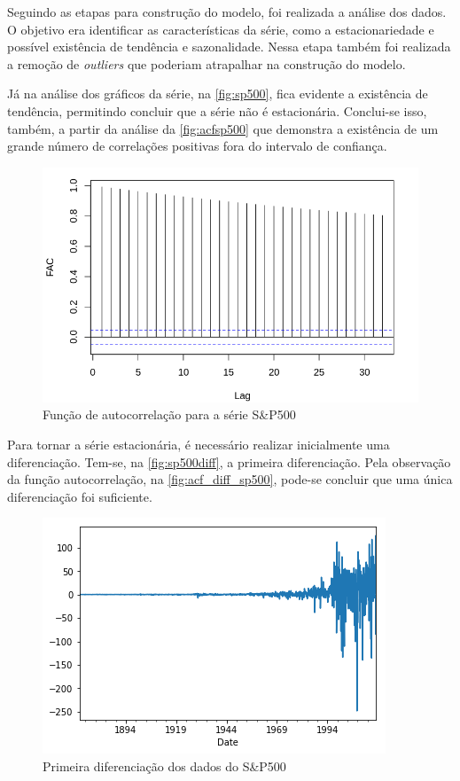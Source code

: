 \documentclass[
    12pt,
    oneside,
    a4paper,
    english,
    brazil
]{abntex2}
\begin{document}
Seguindo  as etapas  para construção  do modelo,  foi realizada  a análise  dos
dados.  O  objetivo  era  identificar  as  características  da  série,  como  a
estacionariedade e possível existência de  tendência e  sazonalidade. Nessa etapa também foi realizada a remoção  de \textit{outliers} que poderiam  atrapalhar na
construção do modelo.

Já na  análise dos gráficos da  série, na \autoref{fig:sp500}, fica  evidente a
existência de  tendência, permitindo concluir  que a série não  é estacionária.
Conclui-se  isso, também,  a partir  da análise  da \autoref{fig:acfsp500}  que
demonstra a  existência de um  grande número  de correlações positivas  fora do
intervalo de confiança.

\begin{figure}[ht]
    \centering
    \caption{Função de autocorrelação para a série S\&P500}\label{fig:acfsp500}
    \includegraphics[width=.5\linewidth]{images/SP500_FAC.png}
\end{figure}

Para  tornar  a série  estacionária,  é  necessário realizar  inicialmente  uma
diferenciação.  Tem-se, na  \autoref{fig:sp500diff}, a  primeira diferenciação.
Pela  observação  da  função autocorrelação,  na  \autoref{fig:acf_diff_sp500},
pode-se concluir que uma única diferenciação foi suficiente.

\begin{figure}[ht]
    \centering
    \caption{Primeira diferenciação dos dados do S\&P500}\label{fig:sp500diff}
    \includegraphics[width=.5\linewidth]{images/sp500diff.png}
\end{figure}
\end{document}
